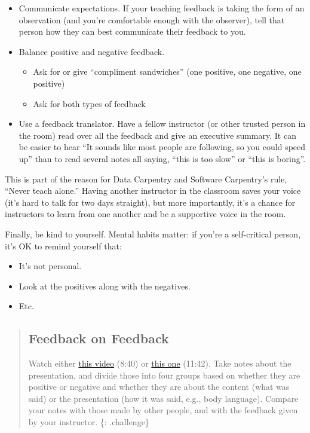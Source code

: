 \begin{itemize}
\item
  Communicate expectations. If your teaching feedback is taking the form
  of an observation (and you're comfortable enough with the observer),
  tell that person how they can best communicate their feedback to you.
\item
  Balance positive and negative feedback.

  \begin{itemize}
  \itemsep1pt\parskip0pt
  \item
    Ask for or give ``compliment sandwiches'' (one positive, one
    negative, one positive)
  \item
    Ask for both types of feedback
  \end{itemize}
\item
  Use a feedback translator. Have a fellow instructor (or other trusted
  person in the room) read over all the feedback and give an executive
  summary. It can be easier to hear ``It sounds like most people are
  following, so you could speed up'' than to read several notes all
  saying, ``this is too slow'' or ``this is boring''.
\end{itemize}

This is part of the reason for Data Carpentry and Software Carpentry's
rule, ``Never teach alone.'' Having another instructor in the classroom
saves your voice (it's hard to talk for two days straight), but more
importantly, it's a chance for instructors to learn from one another and
be a supportive voice in the room.

Finally, be kind to yourself. Mental habits matter: if you're a
self-critical person, it's OK to remind yourself that:

\begin{itemize}
\itemsep1pt\parskip0pt
\item
  It's not personal.
\item
  Look at the positives along with the negatives.
\item
  Etc.
\end{itemize}

\begin{quote}
\subsection{Feedback on Feedback}\label{feedback-on-feedback}

Watch either \href{https://vimeo.com/139316669}{this video} (8:40) or
\href{https://vimeo.com/139181120}{this one} (11:42). Take notes about
the presentation, and divide those into four groups based on whether
they are positive or negative and whether they are about the content
(what was said) or the presentation (how it was said, e.g., body
language). Compare your notes with those made by other people, and with
the feedback given by your instructor. \{: .challenge\}
\end{quote}

